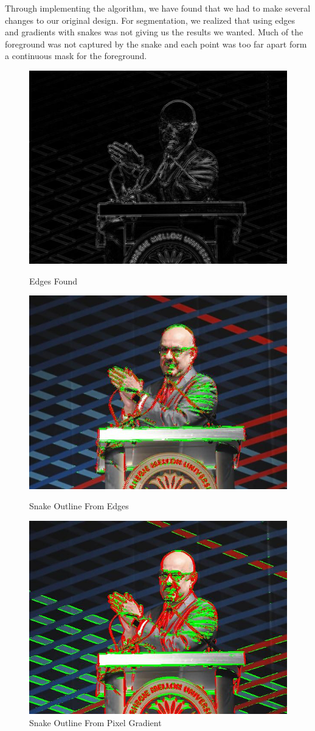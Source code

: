 \documentclass[12pt]{article}
\begin{document}
Through implementing the algorithm, we have found that we had to make several
changes to our original design. For segmentation, we realized that using edges
and gradients with snakes was not giving us the results we wanted.
Much of the foreground was not captured by the snake and each point was
too far apart form a continuous mask for the foreground.

\begin{figure}[!htb]
    \begin{minipage}{0.30\textwidth}
        \centering
        \includegraphics[width=0.7\linewidth]{farnam_edge.jpg}
        \caption{Edges Found}
    \end{minipage}\hfill
    \begin{minipage}{0.30\textwidth}
        \centering
        \includegraphics[width=0.7\linewidth]{farnam_segmented.jpg}
        \caption{Snake Outline From Edges}
    \end{minipage}\hfill
    \begin{minipage}{0.30\textwidth}
        \centering
        \includegraphics[width=0.7\linewidth]{farnam_segmented_rough.jpg}
        \caption{Snake Outline From Pixel Gradient}
    \end{minipage}\hfill
\end{figure}
\end{document}
